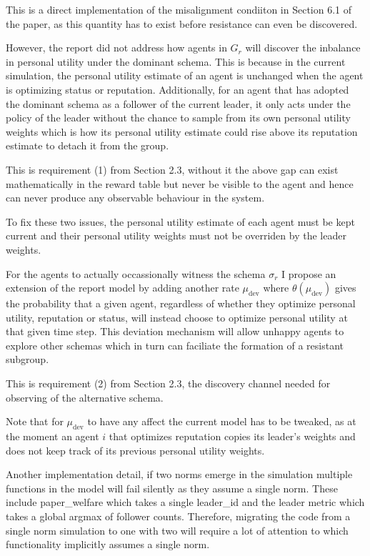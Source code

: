 \documentclass[12pt]{article}
\begin{document}
This is a direct implementation of the misalignment condiiton in Section 6.1 of the paper, as this
quantity has to exist before resistance can even be discovered.

However, the report did not address how agents in $G_r$ will discover the inbalance in personal utility
under the dominant schema. This is because in the current simulation, the personal utility estimate of an agent
is unchanged when the agent is optimizing status or reputation. Additionally, for an agent that has adopted the dominant
schema as a follower of the current leader, it only acts under the policy of the leader without the chance to sample from its own
personal utility weights which is how its personal utility estimate could rise above its reputation estimate to detach it from the group.

This is requirement (1) from Section 2.3, without it the above gap can exist mathematically in the reward table
but never be visible to the agent and hence can never produce any observable behaviour in the system.

To fix these two issues, the personal utility estimate of each agent must be kept current and their personal
utility weights must not be overriden by the leader weights.

For the agents to actually occassionally witness the schema $\sigma_r$ I propose an extension of the report
model by adding another rate $\mu_\text{{dev}}$ where $\theta(\mu_{\text{dev}})$ gives the probability
that a given agent, regardless of whether they optimize personal utility, reputation or status,
will instead choose to optimize personal utility at that given time step. This deviation mechanism
will allow unhappy agents to explore other schemas which in turn can faciliate the formation of a resistant subgroup.

This is requirement (2) from Section 2.3, the discovery channel needed for observing of the alternative schema.

Note that for $\mu_{\text{dev}}$ to have any affect the current model has to be tweaked, as at the moment
an agent $i$ that optimizes reputation copies its leader's weights and does not keep track of its previous personal utility weights.

Another implementation detail, if two norms emerge in the simulation multiple functions in the model will fail silently
as they assume a single norm. These include paper\_welfare which takes a single leader\_id and the leader metric
which takes a global argmax of follower counts. Therefore, migrating the code from a single norm simulation to
one with two will require a lot of attention to which functionality implicitly assumes a single norm. 
\end{document}

